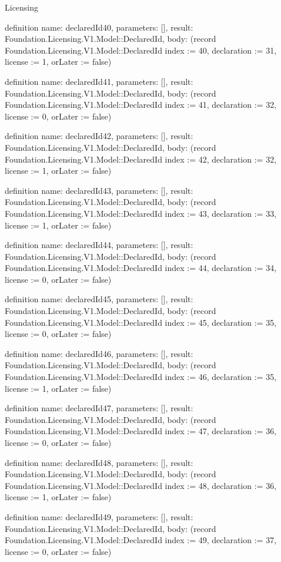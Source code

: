 \begin{lexlean}{Licensing}
\begin{semanticmodule}
definition{
  name: declaredId40,
  parameters: [],
  result: Foundation.Licensing.V1.Model::DeclaredId,
  body: (record Foundation.Licensing.V1.Model::DeclaredId {index := 40, declaration := 31, license := 1, orLater := false})
}

definition{
  name: declaredId41,
  parameters: [],
  result: Foundation.Licensing.V1.Model::DeclaredId,
  body: (record Foundation.Licensing.V1.Model::DeclaredId {index := 41, declaration := 32, license := 0, orLater := false})
}

definition{
  name: declaredId42,
  parameters: [],
  result: Foundation.Licensing.V1.Model::DeclaredId,
  body: (record Foundation.Licensing.V1.Model::DeclaredId {index := 42, declaration := 32, license := 1, orLater := false})
}

definition{
  name: declaredId43,
  parameters: [],
  result: Foundation.Licensing.V1.Model::DeclaredId,
  body: (record Foundation.Licensing.V1.Model::DeclaredId {index := 43, declaration := 33, license := 1, orLater := false})
}

definition{
  name: declaredId44,
  parameters: [],
  result: Foundation.Licensing.V1.Model::DeclaredId,
  body: (record Foundation.Licensing.V1.Model::DeclaredId {index := 44, declaration := 34, license := 0, orLater := false})
}

definition{
  name: declaredId45,
  parameters: [],
  result: Foundation.Licensing.V1.Model::DeclaredId,
  body: (record Foundation.Licensing.V1.Model::DeclaredId {index := 45, declaration := 35, license := 0, orLater := false})
}

definition{
  name: declaredId46,
  parameters: [],
  result: Foundation.Licensing.V1.Model::DeclaredId,
  body: (record Foundation.Licensing.V1.Model::DeclaredId {index := 46, declaration := 35, license := 1, orLater := false})
}

definition{
  name: declaredId47,
  parameters: [],
  result: Foundation.Licensing.V1.Model::DeclaredId,
  body: (record Foundation.Licensing.V1.Model::DeclaredId {index := 47, declaration := 36, license := 0, orLater := false})
}

definition{
  name: declaredId48,
  parameters: [],
  result: Foundation.Licensing.V1.Model::DeclaredId,
  body: (record Foundation.Licensing.V1.Model::DeclaredId {index := 48, declaration := 36, license := 1, orLater := false})
}

definition{
  name: declaredId49,
  parameters: [],
  result: Foundation.Licensing.V1.Model::DeclaredId,
  body: (record Foundation.Licensing.V1.Model::DeclaredId {index := 49, declaration := 37, license := 0, orLater := false})
}


\end{semanticmodule}
\end{lexlean}
